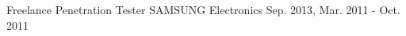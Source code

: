 \begin{cventries}
{\begin{cvitems}
        \item {}
      \end{cvitems}
    }
  \cventry
    {Freelance Penetration Tester}
    {SAMSUNG Electronics}
    {}
    {Sep. 2013, Mar. 2011 - Oct. 2011}
    {
      \begin{cvitems}
        \item {\textbf{}}
        \item {}
        \item {}
      \end{cvitems}
    }
\end{cventries}